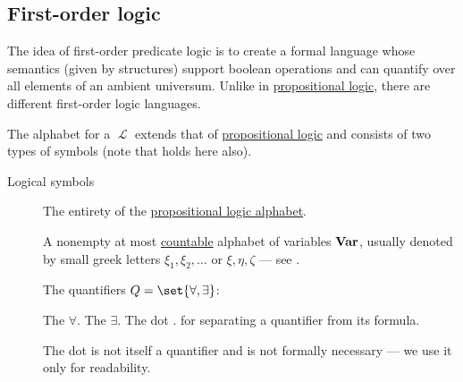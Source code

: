 \subsection{First-order logic}\label{subsec:first_order_logic}

\begin{definition}\label{def:first_order_language}
  The idea of first-order predicate logic is to create a formal language whose semantics (given by structures) support boolean operations and can quantify over all elements of an ambient universum. Unlike in \hyperref[subsec:propositional_logic]{propositional logic}, there are different first-order logic languages.

  The alphabet for a  \( \mscrL \) extends that of \hyperref[subsec:propositional_logic]{propositional logic} and consists of two types of symbols (note that  holds here also).

  \begin{description}
    \item[Logical symbols]
    \hfill
    \begin{thmenum}[series=def:first_order_language]
       The entirety of the \hyperref[subsec:propositional_logic]{propositional logic alphabet}.

       A nonempty at most \hyperref[rem:cardinals/countably_infinite]{countable} alphabet of variables \( \operatorname{\mathbf{Var}} \), usually denoted by small greek letters \( \xi_1, \xi_2, \ldots \) or \( \xi, \eta, \zeta \) --- see .

       The quantifiers \( Q = \set{ \forall, \exists } \):
      \begin{thmenum}
         The  \( \forall \).
         The  \( \exists \).
         The dot \( . \) for separating a quantifier from its formula.
      \end{thmenum}

      The dot is not itself a quantifier and is not formally necessary --- we use it only for readability.


\end{thmenum}
\end{description}
\end{definition}
